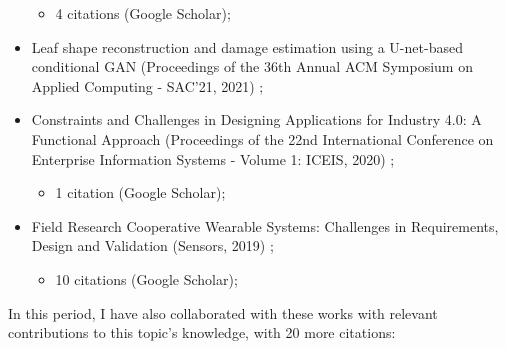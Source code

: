 \begin{itemize}
    \begin{itemize}
        \item 4 citations (Google Scholar);
    \end{itemize}
    \item Leaf shape reconstruction and damage estimation using a U-net-based conditional GAN (Proceedings of the 36th Annual ACM Symposium on Applied Computing - SAC'21, 2021) \cite{silva2021leaf};
    \item Constraints and Challenges in Designing Applications for Industry 4.0: A Functional Approach (Proceedings of the 22nd International Conference on Enterprise Information Systems - Volume 1: ICEIS, 2020) \cite{iceis20robotics};
    \begin{itemize}
        \item 1 citation (Google Scholar);
    \end{itemize}
    \item Field Research Cooperative Wearable Systems: Challenges in Requirements, Design and Validation (Sensors, 2019) \cite{silva2019field};
    \begin{itemize}
        \item 10 citations (Google Scholar);
    \end{itemize}
\end{itemize}

In this period, I have also collaborated with these works with relevant contributions to this topic's knowledge, with 20 more citations:

